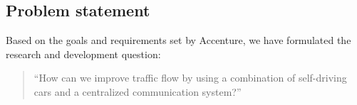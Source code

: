\subsection{Problem statement}\label{sec:problem_statement}
Based on the goals and requirements set by Accenture, we have formulated the research and development question:
\begin{quote}
	“How can we improve traffic flow by using a combination of self-driving cars and a centralized communication system?” 
\end{quote}